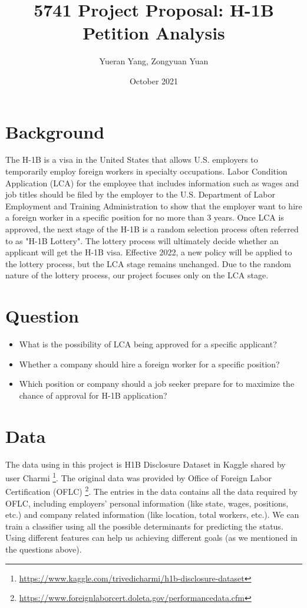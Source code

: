 \documentclass{article}
\title{\vspace{-1.5cm}5741 Project Proposal: H-1B Petition Analysis}
\author{Yueran Yang, Zongyuan Yuan}
\date{October 2021}
\begin{document}
\maketitle
\section{Background}

The H-1B is a visa in the United States that allows U.S. employers to temporarily employ foreign workers in specialty occupations. Labor Condition Application (LCA) for the employee that includes information such as wages and job titles should be filed by the employer to the  U.S. Department of Labor Employment and Training Administration to show that the employer want to hire a foreign worker in a specific position for no more than 3 years. Once LCA is approved, the next stage of the H-1B is a random selection process often referred to as "H-1B Lottery". The lottery process will ultimately decide whether an applicant will get the H-1B visa. Effective 2022, a new policy will be applied to the lottery process, but the LCA stage remains unchanged. Due to the random nature of the lottery process, our project focuses only on the LCA stage.

\section{Question}
\begin{itemize}
    \item What is the possibility of LCA being approved for a specific applicant?  
    \item Whether a company should hire a foreign worker for a specific position?
    \item Which position or company should a job seeker prepare for to maximize the chance of approval for H-1B application? 
\end{itemize}
 

\section{Data}
The data using in this project is H1B Disclosure Dataset in Kaggle shared by user Charmi \footnote{\url{https://www.kaggle.com/trivedicharmi/h1b-disclosure-dataset}}. The original data was provided by Office of Foreign Labor Certification (OFLC) \footnote{\url{https://www.foreignlaborcert.doleta.gov/performancedata.cfm}}. The entries in the data contains all the data required by OFLC, including employers' personal information (like state, wages, positions, etc.) and company related information (like location, total workers, etc.). We can train a classifier using all the possible determinants for predicting the status. Using different features can help us achieving different goals (as we mentioned in the questions above). 
\end{document}
